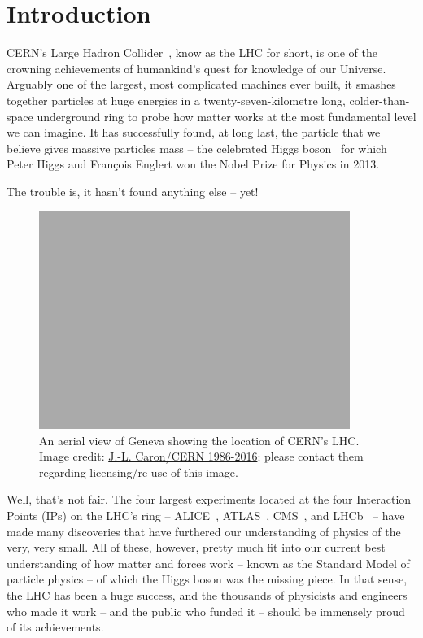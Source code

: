 \section{Introduction}
\label{sec:intro}
\acs{CERN}'s
Large Hadron Collider~\cite{LHC2008}, know as the \acs{LHC} for short,
is one of the crowning achievements of humankind's quest for knowledge of
our Universe.
%
Arguably one of the largest, most complicated machines ever built,
it smashes together particles at huge energies in a
twenty-seven-kilometre long, colder-than-space underground ring to probe
how matter works at the most fundamental level we can imagine.
It has successfully found, at long last, the particle that we believe gives
massive particles mass -- the celebrated
Higgs boson~\cite{CMS2012a,ATLAS2012c}
for which Peter Higgs
and
François Englert
won the Nobel Prize for Physics in 2013.

The trouble is, it hasn't found anything else -- yet!

%
\begin{figure}[htbp]
  \centering
  \includegraphics[width=0.9\textwidth]{assets/images/lhc/lhc.jpg}
  \caption[An aerial view of Geneva showing the location of the LHC]
  {\label{fig:lsstartistimpr}An aerial view of Geneva showing the location of \acs{CERN}'s \acf{LHC}. Image credit: \href{http://cds.cern.ch/record/841527}{J.-L. Caron/CERN 1986-2016}; please contact them regarding licensing/re-use of this image.}
\end{figure}
%

Well, that's not fair. The four largest experiments located at the
four Interaction Points (IPs) on
the \ac{LHC}'s ring -- \acs{ALICE}~\cite{ALICE2008},
\acs{ATLAS}~\cite{ATLAS2008},
\acs{CMS}~\cite{CMS2008},
and
\acs{LHCb}~\cite{LHCb2008} -- have made many discoveries that have furthered
our understanding of physics of the very, very small.
%
All of these, however, pretty much fit into our current best understanding
of how matter and forces work -- known as
the Standard Model of particle physics -- of which the Higgs boson was
the missing piece.
%
In that sense, the \acs{LHC} has been a huge success,
and the thousands of physicists and engineers who made it work -- and
the public who funded it -- should be immensely proud of its achievements.

